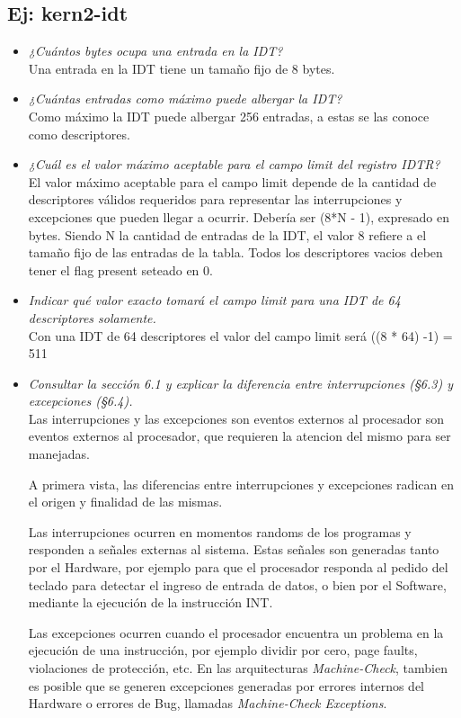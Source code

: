 \documentclass[a4paper, 12pt]{article}
\begin{document}
		\subsection{Ej: kern2-idt}
		\begin{itemize}
			\item \textit{¿Cuántos bytes ocupa una entrada en la IDT?\\}
			Una entrada en la IDT tiene un tamaño fijo de 8 bytes.\\
			\item \textit{¿Cuántas entradas como máximo puede albergar la IDT?\\}
			Como máximo la IDT puede albergar 256 entradas, a estas se las conoce como
			descriptores.\\
			\item \textit{¿Cuál es el valor máximo aceptable para el campo limit
			del registro IDTR?\\}
			El valor máximo aceptable para el campo limit depende de la cantidad
			de descriptores válidos
			requeridos para representar las interrupciones y excepciones que
			pueden llegar a ocurrir.
			Debería ser (8*N - 1), expresado en bytes.
			Siendo N la cantidad de entradas de la IDT, el valor 8 refiere 
			a el tamaño fijo de las entradas de la tabla.
			Todos los descriptores vacios deben tener el flag present seteado
			en 0.\\
			\item \textit{Indicar qué valor exacto tomará el campo limit para
			una IDT de 64 descriptores solamente.\\}
			Con una IDT de 64 descriptores el valor del campo limit será
			((8 * 64) -1) = 511\\
			\item \textit{Consultar la sección 6.1 y explicar la diferencia
			entre interrupciones (§6.3) y excepciones (§6.4).\\}
			Las interrupciones y las excepciones son eventos externos al
			procesador son eventos externos
			al procesador, que requieren la atencion del mismo para ser manejadas.

			A primera vista, las diferencias entre interrupciones y excepciones
			radican en el origen y finalidad de las mismas.

			Las interrupciones ocurren en momentos randoms de los programas y
			responden a señales externas al sistema.
			Estas señales son generadas tanto por el Hardware, por ejemplo para
			que el procesador responda al pedido del teclado para detectar el
			ingreso de entrada de datos, o bien por el Software, mediante la
			ejecución de la instrucción INT.

			Las excepciones ocurren cuando el procesador encuentra un problema
			en la ejecución de una instrucción, por ejemplo dividir por cero,
			page faults, violaciones de protección, etc. En las arquitecturas
			\textit{Machine-Check}, tambien es posible que se generen excepciones
			generadas por errores internos del Hardware o errores de Bug,
			llamadas \textit{Machine-Check Exceptions}.\\
		\end{itemize}
\end{document}

